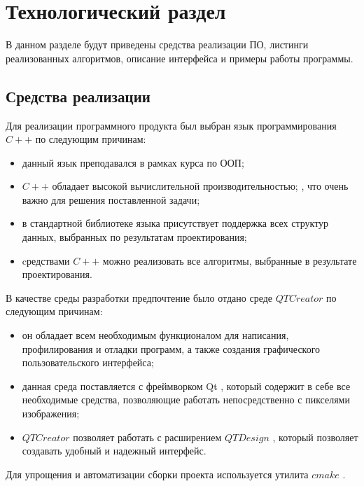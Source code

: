 \chapter{Технологический раздел}


В данном разделе будут приведены средства реализации ПО, листинги реализованных алгоритмов, описание интерфейса и примеры работы программы.

\section{Средства реализации}

Для реализации программного продукта был выбран язык программирования $C++$ \cite{info_pl} по следующим причинам:

\begin{itemize}[label*=--]
	\item данный язык преподавался в рамках курса по ООП;
	\item $C++$ обладает высокой вычислительной производительностью; \cite{info_cmpCplplPy, info_cmpCplplJava}, что очень важно для решения поставленной задачи;
	\item в стандартной библиотеке языка присутствует поддержка всех
	структур данных, выбранных по результатам проектирования;
	\item cредствами $C++$ можно реализовать все алгоритмы, выбранные в результате проектирования.
\end{itemize}

В качестве среды разработки предпочтение было отдано среде $QTCreator$ \cite{info_QtCr} по следующим причинам:

\begin{itemize}[label*=---]
	\item он обладает всем необходимым функционалом для написания, профилирования и
	отладки программ, а также создания графического пользовательского интерфейса;
	\item данная среда поставляется с фреймворком Qt \cite{info_QtDoc}, который содержит в себе все необходимые средства, позволяющие работать непосредственно с
	пикселями изображения;
	\item $QTCreator$ позволяет работать с расширением $QT Design$ \cite{info_QtDes}, который позволяет создавать удобный и надежный интерфейс.
\end{itemize}

Для упрощения и автоматизации сборки проекта используется утилита $cmake$ \cite{info_Cmake}.

